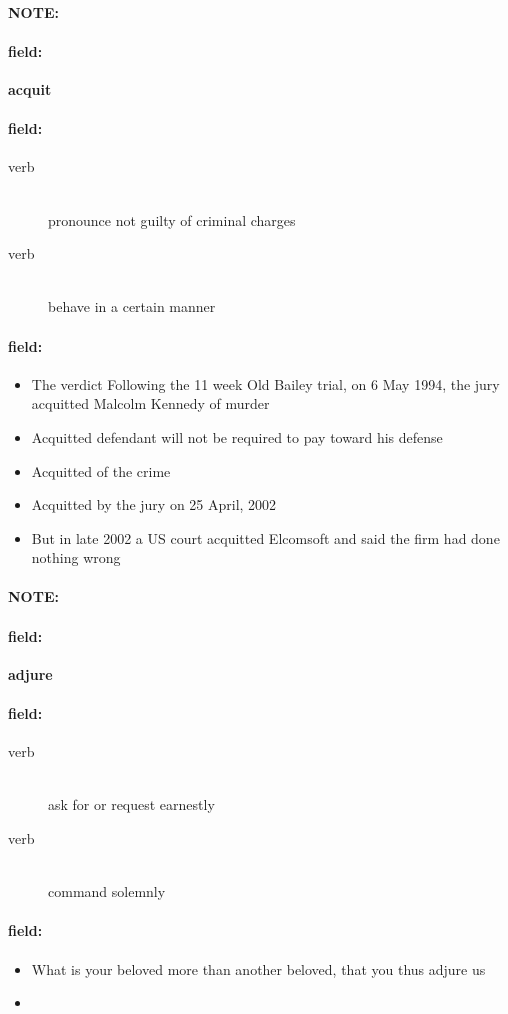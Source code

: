 \documentclass[12pt]{article}
\newenvironment{note}{\paragraph{NOTE:}}{}
\newenvironment{field}{\paragraph{field:}}{}
\begin{document}
\begin{note}
\begin{field}
\textbf{\large acquit}
\end{field}


\begin{field}
\begin{description}
\item[verb] \hfill \\ 
pronounce not guilty of criminal charges

\item[verb] \hfill \\ 
behave in a certain manner

\end{description}
\end{field}

\begin{field}
\begin{itemize}
\item The verdict Following the 11 week Old Bailey trial, on 6 May 1994, the jury acquitted Malcolm Kennedy of murder
\item Acquitted defendant will not be required to pay toward his defense
\item Acquitted of the crime
\item Acquitted by the jury on 25 April, 2002
\item But in late 2002 a US court acquitted Elcomsoft and said the firm had done nothing wrong
\end{itemize}
\end{field}
\end{note}
\begin{note}
\begin{field}
\textbf{\large adjure}
\end{field}


\begin{field}
\begin{description}
\item[verb] \hfill \\ 
ask for or request earnestly

\item[verb] \hfill \\ 
command solemnly

\end{description}
\end{field}

\begin{field}
\begin{itemize}
\item What is your beloved more than another beloved, that you thus adjure us
\item 
\end{itemize}
\end{field}
\end{note}
\end{document}
